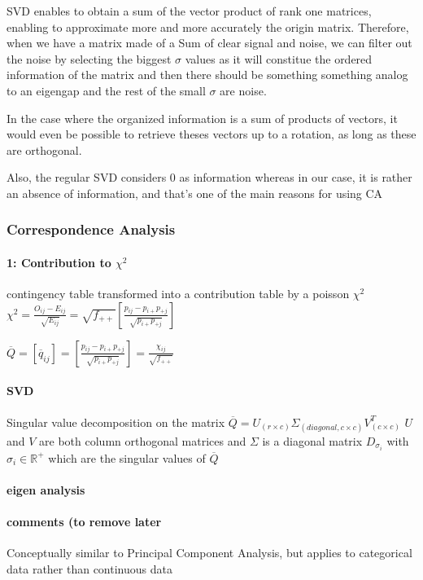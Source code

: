 \documentclass{article}
\begin{document}
SVD enables to obtain a sum of the vector product of rank one matrices, enabling to approximate more and more accurately the origin matrix. Therefore, when we have a matrix made of a Sum of clear signal and noise, we can filter out the noise by selecting the biggest $\sigma$ values as it will constitue the ordered information of the matrix and then there should be something something analog to an eigengap and the rest of the small $\sigma$ are noise.

In the case where the organized information is a sum of products of vectors, it would even be possible to retrieve theses vectors up to a rotation, as long as these are orthogonal.

Also, the regular SVD considers 0 as information whereas in our case, it is rather an absence of information, and that's one of the main reasons for using CA

\subsubsection{Correspondence Analysis}

\paragraph{1: Contribution to $\chi^2$}

contingency table transformed into a contribution table by a poisson $\chi^2$ 
$\chi^2 = \frac{O_{ij} -  E_{ij}}{\sqrt{E_{ij}}} = \sqrt{f_{++}}[\frac{p_{ij} - p_{i+}p_{+j}}{\sqrt{p_{i+}p_{+j}}}]$

$\overline{Q} = [\overline{q}_{ij}] = [\frac{p_{ij} - p_{i+}p_{+j}}{\sqrt{p_{i+}p_{+j}}}] = \frac{\chi_{ij}}{\sqrt{f_{++}}}$

\paragraph{SVD}

Singular value decomposition on the matrix $\overline{Q} = U_{(r\times c)} \Sigma_{(diagonal, c\times c)} V_{(c \times c)}^T$ 
$U$ and $V$ are both column orthogonal matrices and $\Sigma$ is a diagonal matrix $D_{\sigma_i}$ with $\sigma_i \in \mathbb{R}^+$ which are the singular values of $\overline{Q}$


\paragraph{eigen analysis}

\paragraph{comments (to remove later}
Conceptually similar to Principal Component Analysis, but applies to categorical data rather than continuous data
\end{document}
